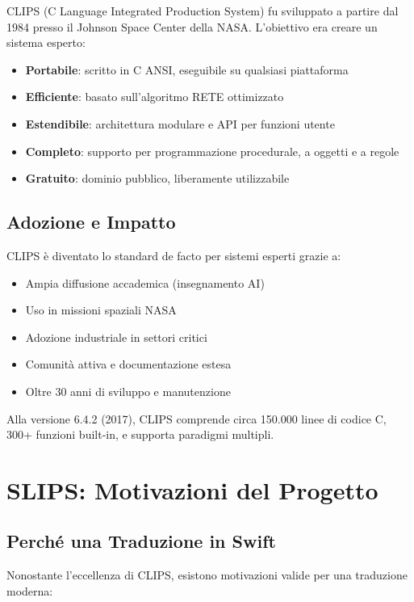 CLIPS (C Language Integrated Production System) fu sviluppato a partire dal 1984 presso il Johnson Space Center della NASA. L'obiettivo era creare un sistema esperto:

\begin{itemize}
\item \textbf{Portabile}: scritto in C ANSI, eseguibile su qualsiasi piattaforma
\item \textbf{Efficiente}: basato sull'algoritmo RETE ottimizzato
\item \textbf{Estendibile}: architettura modulare e API per funzioni utente
\item \textbf{Completo}: supporto per programmazione procedurale, a oggetti e a regole
\item \textbf{Gratuito}: dominio pubblico, liberamente utilizzabile
\end{itemize}

\subsection{Adozione e Impatto}

CLIPS è diventato lo standard de facto per sistemi esperti grazie a:

\begin{itemize}
\item Ampia diffusione accademica (insegnamento AI)
\item Uso in missioni spaziali NASA
\item Adozione industriale in settori critici
\item Comunità attiva e documentazione estesa
\item Oltre 30 anni di sviluppo e manutenzione
\end{itemize}

Alla versione 6.4.2 (2017), CLIPS comprende circa 150.000 linee di codice C, 300+ funzioni built-in, e supporta paradigmi multipli.

\section{SLIPS: Motivazioni del Progetto}

\subsection{Perché una Traduzione in Swift}

Nonostante l'eccellenza di CLIPS, esistono motivazioni valide per una traduzione moderna:

